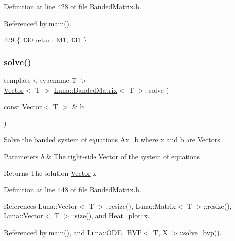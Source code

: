 Definition at line 428 of file Banded\+Matrix.\+h.



Referenced by main().


\begin{DoxyCode}
429   \{
430     \textcolor{keywordflow}{return} M1;
431   \}
\end{DoxyCode}
\mbox{\label{classLuna_1_1BandedMatrix_aa17b803cb1933ae1f33ff16c8a872060}} 
\subsubsection{\texorpdfstring{solve()}{solve()}\hspace{0.1cm}{\footnotesize\ttfamily [1/2]}}
{\footnotesize\ttfamily template$<$typename T $>$ \\
\hyperlink{classLuna_1_1Vector}{Vector}$<$ T $>$ \hyperlink{classLuna_1_1BandedMatrix}{Luna\+::\+Banded\+Matrix}$<$ T $>$\+::solve (\begin{DoxyParamCaption}\item[{const \hyperlink{classLuna_1_1Vector}{Vector}$<$ T $>$ \&}]{b }\end{DoxyParamCaption})\hspace{0.3cm}{\ttfamily [inline]}}



Solve the banded system of equations Ax=b where x and b are Vectors. 


\begin{DoxyParams}{Parameters}
{\em b} & The right-\/side \hyperlink{classLuna_1_1Vector}{Vector} of the system of equations \\
\hline
\end{DoxyParams}
\begin{DoxyReturn}{Returns}
The solution \hyperlink{classLuna_1_1Vector}{Vector} x 
\end{DoxyReturn}


Definition at line 448 of file Banded\+Matrix.\+h.



References Luna\+::\+Vector$<$ T $>$\+::resize(), Luna\+::\+Matrix$<$ T $>$\+::resize(), Luna\+::\+Vector$<$ T $>$\+::size(), and Heat\+\_\+plot\+::x.



Referenced by main(), and Luna\+::\+O\+D\+E\+\_\+\+B\+V\+P$<$ T, X $>$\+::solve\+\_\+bvp().


